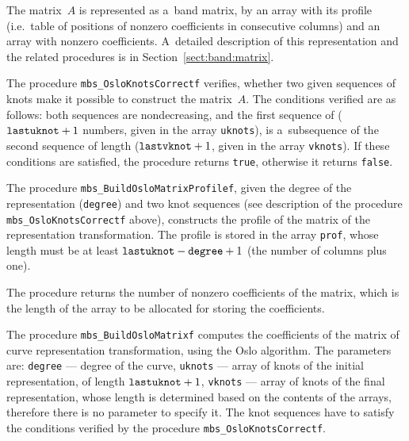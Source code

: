 The matrix~$A$ is represented as a~band matrix, by an array with its profile
(i.e.\ table of positions of nonzero coefficients in consecutive
columns) and an array with nonzero coefficients. A~detailed description
of this representation and the related procedures is in
Section~\ref{sect:band:matrix}.

\vspace{\bigskipamount}
\begin{sloppypar}
The procedure \texttt{mbs\_OsloKnotsCorrectf} verifies, whether two given
sequences of knots make it possible to construct the matrix~$A$. The
conditions verified are as follows: both sequences are nondecreasing,
and the first sequence of ($\mathord{\mbox{\texttt{lastuknot}}}+1$
numbers, given in the array \texttt{uknots}), is a~subsequence of the
second sequence of length ($\mathord{\mbox{\texttt{lastvknot}}}+1$,
given in the array \texttt{vknots}). If these conditions are satisfied,
the procedure returns \texttt{true}, otherwise it returns \texttt{false}.
\end{sloppypar}

\vspace{\bigskipamount}
The procedure \texttt{mbs\_BuildOsloMatrixProfilef}, given the degree
of the representation (\texttt{degree}) and two knot sequences
(see description of the procedure \texttt{mbs\_OsloKnotsCorrectf} above),
constructs the profile of the matrix of the representation transformation.
The profile is stored in the array \texttt{prof}, whose length must be
at least
$\mathord{\mbox{\texttt{lastuknot}}}-\mathord{\mbox{\texttt{degree}}}+1$
(the number of columns plus one).

The procedure returns the number of nonzero coefficients of the matrix,
which is the length of the array to be allocated for storing the coefficients.

\vspace{\bigskipamount}
The procedure \texttt{mbs\_BuildOsloMatrixf} computes the coefficients of the
matrix of curve representation transformation, using the Oslo algorithm.
The parameters are:
\texttt{degree} --- degree of the curve, \texttt{uknots} --- array
of knots of the initial representation, of length
$\mathord{\mbox{\texttt{lastuknot}}}+1$, \texttt{vknots} --- array
of knots of the final representation, whose length is determined
based on the contents of the arrays, therefore there is no parameter
to specify it. The knot sequences have to satisfy the conditions
verified by the procedure \texttt{mbs\_OsloKnotsCorrectf}.

